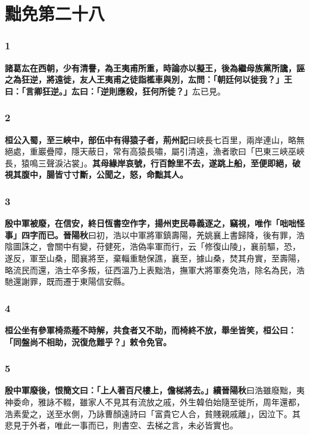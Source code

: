 \chapter{黜免第二十八}

\subsection*{1}

\textbf{諸葛厷在西朝，少有清譽，為王夷甫所重，時論亦以擬王，後為繼母族黨所讒，誣之為狂逆，將遠徙，友人王夷甫之徒詣檻車與別，厷問：「朝廷何以徙我？」王曰：「言卿狂逆。」厷曰：「逆則應殺，狂何所徙？」}{\footnotesize 厷已見。}

\subsection*{2}

\textbf{桓公入蜀，至三峽中，部伍中有得猿子者，}{\footnotesize \textbf{荊州記}曰峽長七百里，兩岸連山，略無絕處，重巖疊障，隱天蔽日，常有高猿長嘯，屬引清遠，漁者歌曰「巴東三峽巫峽長，猿鳴三聲淚沾裳」。}\textbf{其母緣岸哀號，行百餘里不去，遂跳上船，至便即絕，破視其腹中，腸皆寸寸斷，公聞之，怒，命黜其人。}

\subsection*{3}

\textbf{殷中軍被廢，在信安，終日恆書空作字，揚州吏民尋義逐之，竊視，唯作「咄咄怪事」四字而已。}{\footnotesize \textbf{晉陽秋}曰初，浩以中軍將軍鎮壽陽，羌姚襄上書歸降，後有罪，浩陰圖誅之，會關中有變，苻健死，浩偽率軍而行，云「修復山陵」，襄前驅，恐，遂反，軍至山桑，聞襄將至，棄輜重馳保譙，襄至，據山桑，焚其舟實，至壽陽，略流民而還，浩士卒多叛，征西溫乃上表黜浩，撫軍大將軍奏免浩，除名為民，浩馳還謝罪，既而遷于東陽信安縣。}

\subsection*{4}

\textbf{桓公坐有參軍椅烝薤不時解，共食者又不助，而椅終不放，舉坐皆笑，桓公曰：「同盤尚不相助，況復危難乎？」敕令免官。}

\subsection*{5}

\textbf{殷中軍廢後，恨簡文曰：「上人著百尺樓上，儋梯將去。」}{\footnotesize \textbf{續晉陽秋}曰浩雖廢黜，夷神委命，雅詠不輟，雖家人不見其有流放之戚，外生韓伯始隨至徙所，周年還都，浩素愛之，送至水側，乃詠曹顏遠詩曰「富貴它人合，貧賤親戚離」，因泣下。其悲見于外者，唯此一事而已，則書空、去梯之言，未必皆實也。}

